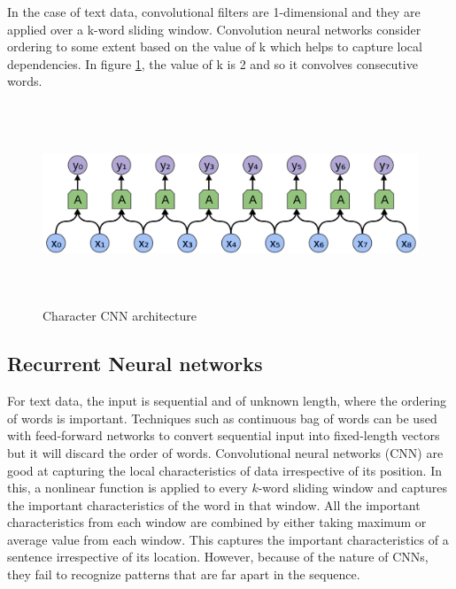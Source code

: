 \documentclass[a4paper, 11pt]{article}
\begin{document}
In the case of text data, convolutional filters are 1-dimensional and they are applied over a k-word sliding window. Convolution neural networks consider ordering to some extent based on the value of k which helps to capture local dependencies. In figure \ref{fig:Char CNN architecture}, the value of k is 2 and so it convolves consecutive words. 
\begin{figure}[H]
    \centering
    \includegraphics[width=\textwidth,height=6cm,keepaspectratio=true]
    {cnn-2.png}
    \caption{
        Character CNN architecture
    }
    \label{fig:Char CNN architecture}
\end{figure}


\subsection{Recurrent Neural networks}


For text data, the input is sequential and of unknown length, where the ordering of words is important. Techniques such as continuous bag of words \parencite{DBLP:journals/corr/abs-1301-3781} can be used with feed-forward networks to convert sequential input into fixed-length vectors but it will discard the order of words. Convolutional neural networks (CNN) \parencite{Bengio1997} are good at capturing the local characteristics of data irrespective of its position. In this, a nonlinear function is applied to every $k$-word sliding window and captures the important characteristics of the word in that window. All the important characteristics from each window are combined by either taking maximum or average value from each window. This captures the important characteristics of a sentence irrespective of its location. However, because of the nature of CNNs, they fail to recognize patterns that are far apart in the sequence.
\end{document}
